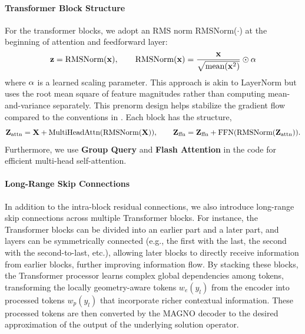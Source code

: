 \documentclass[reqno,10pt]{amsart}
\theoremstyle{plain}
\theoremstyle{definition}
\begin{document}
\paragraph{\bf Transformer Block Structure} For the transformer blocks, we adopt an RMS norm RMSNorm($\cdot$) at the beginning of attention and feedforward layer:
\begin{equation}
    {\bf z} = \text{RMSNorm}({\bf x}), \qquad \text{RMSNorm}({\bf x}) = \frac{{\bf x}}{\sqrt{\text{mean}({\bf x}^2)}} \odot {\bf \alpha}
\end{equation}
where ${\bf \alpha}$ is a learned scaling parameter. This approach is akin to LayerNorm but uses the root mean square of feature magnitudes rather than computing mean-and-variance separately. This prenorm design helps stabilize the gradient flow compared to the conventions in \cite{AV2017}. Each block has the structure,
\begin{equation}
    {\bf Z}_{\text{attn}} = {\bf X} + \text{MultiHeadAttn}(\text{RMSNorm}({\bf X})), \qquad {\bf Z}_{\text{ffn}} = {\bf Z}_{\text{ffn}} + \text{FFN}(\text{RMSNorm}({\bf Z}_{\text{attn}})).    
\end{equation}
Furthermore, we use {\bf Group Query} and {\bf Flash Attention} in the code for efficient multi-head self-attention.

\paragraph{\bf Long-Range Skip Connections} In addition to the intra-block residual connections, we also introduce long-range skip connections across multiple Transformer blocks. For instance, the Transformer blocks can be divided into an earlier part and a later part, and layers can be symmetrically connected (e.g., the first with the last, the second with the second-to-last, etc.), allowing later blocks to directly receive information from earlier blocks, further improving information flow. By stacking these blocks, the Transformer processor learns complex global dependencies among tokens, transforming the locally geometry-aware tokens $w_e(y_l)$ from the encoder into processed tokens $w_p(y_l)$ that incorporate richer contextual information. These processed tokens are then converted by the MAGNO decoder to the desired approximation of the output of the underlying solution operator.



\end{document}
